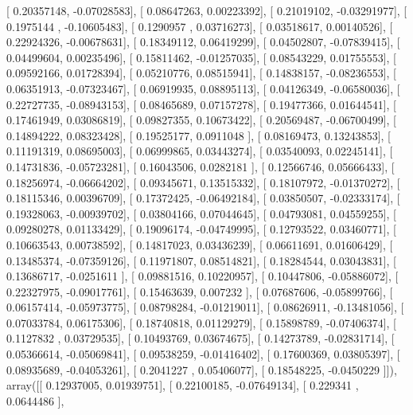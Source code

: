 \documentclass{article}
\begin{document}
       [ 0.20357148, -0.07028583],
       [ 0.08647263,  0.00223392],
       [ 0.21019102, -0.03291977],
       [ 0.1975144 , -0.10605483],
       [ 0.1290957 ,  0.03716273],
       [ 0.03518617,  0.00140526],
       [ 0.22924326, -0.00678631],
       [ 0.18349112,  0.06419299],
       [ 0.04502807, -0.07839415],
       [ 0.04499604,  0.00235496],
       [ 0.15811462, -0.01257035],
       [ 0.08543229,  0.01755553],
       [ 0.09592166,  0.01728394],
       [ 0.05210776,  0.08515941],
       [ 0.14838157, -0.08236553],
       [ 0.06351913, -0.07323467],
       [ 0.06919935,  0.08895113],
       [ 0.04126349, -0.06580036],
       [ 0.22727735, -0.08943153],
       [ 0.08465689,  0.07157278],
       [ 0.19477366,  0.01644541],
       [ 0.17461949,  0.03086819],
       [ 0.09827355,  0.10673422],
       [ 0.20569487, -0.06700499],
       [ 0.14894222,  0.08323428],
       [ 0.19525177,  0.0911048 ],
       [ 0.08169473,  0.13243853],
       [ 0.11191319,  0.08695003],
       [ 0.06999865,  0.03443274],
       [ 0.03540093,  0.02245141],
       [ 0.14731836, -0.05723281],
       [ 0.16043506,  0.0282181 ],
       [ 0.12566746,  0.05666433],
       [ 0.18256974, -0.06664202],
       [ 0.09345671,  0.13515332],
       [ 0.18107972, -0.01370272],
       [ 0.18115346,  0.00396709],
       [ 0.17372425, -0.06492184],
       [ 0.03850507, -0.02333174],
       [ 0.19328063, -0.00939702],
       [ 0.03804166,  0.07044645],
       [ 0.04793081,  0.04559255],
       [ 0.09280278,  0.01133429],
       [ 0.19096174, -0.04749995],
       [ 0.12793522,  0.03460771],
       [ 0.10663543,  0.00738592],
       [ 0.14817023,  0.03436239],
       [ 0.06611691,  0.01606429],
       [ 0.13485374, -0.07359126],
       [ 0.11971807,  0.08514821],
       [ 0.18284544,  0.03043831],
       [ 0.13686717, -0.0251611 ],
       [ 0.09881516,  0.10220957],
       [ 0.10447806, -0.05886072],
       [ 0.22327975, -0.09017761],
       [ 0.15463639,  0.007232  ],
       [ 0.07687606, -0.05899766],
       [ 0.06157414, -0.05973775],
       [ 0.08798284, -0.01219011],
       [ 0.08626911, -0.13481056],
       [ 0.07033784,  0.06175306],
       [ 0.18740818,  0.01129279],
       [ 0.15898789, -0.07406374],
       [ 0.1127832 ,  0.03729535],
       [ 0.10493769,  0.03674675],
       [ 0.14273789, -0.02831714],
       [ 0.05366614, -0.05069841],
       [ 0.09538259, -0.01416402],
       [ 0.17600369,  0.03805397],
       [ 0.08935689, -0.04053261],
       [ 0.2041227 ,  0.05406077],
       [ 0.18548225, -0.0450229 ]]), array([[ 0.12937005,  0.01939751],
       [ 0.22100185, -0.07649134],
       [ 0.229341  ,  0.0644486 ],
\end{document}
